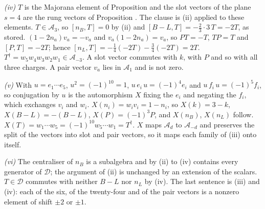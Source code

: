 \emph{(iv)} $T$ is the Majorana element of Proposition  and the slot vectors of the plane $s = 4$ are the rung vectors of Proposition . The clause is (ii) applied to these elements. $T \in \mathcal{A}_{3}$, so $[n_{B}, T] = 0$ by (ii) and $[B - L, T] = -\tfrac23 \cdot 3\,T = -2T$, as stored. $(1 - 2n_{a})v_{a} = -v_{a}$ and $v_{a}(1 - 2n_{a}) = v_{a}$, so $PT = -T$, $TP = T$ and $[P, T] = -2T$; hence $[n_{L}, T] = -\tfrac14(-2T) - \tfrac34(-2T) = 2T$. $T^{\dagger} = w_{5}w_{4}w_{3}w_{2}w_{1} \in \mathcal{A}_{-3}$. A slot vector commutes with $k$, with $P$ and so with all three charges. A pair vector $v_{a}$ lies in $\mathcal{A}_{1}$ and is not zero.

\emph{(v)} With $u = e_{1}\cdots e_{5}$, $u^{2} = (-1)^{10} = 1$, $u\,e_{i}\,u = (-1)^{4}e_{i}$ and $u\,f_{i}\,u = (-1)^{5}f_{i}$, so conjugation by $u$ is the automorphism $X$ fixing the $e_{i}$ and negating the $f_{i}$, which exchanges $v_{i}$ and $w_{i}$. $X(n_{i}) = w_{i}v_{i} = 1 - n_{i}$, so $X(k) = 3 - k$, $X(B - L) = -(B - L)$, $X(P) = (-1)^{3}P$, and $X(n_{B})$, $X(n_{L})$ follow. $X(T) = w_{1}\cdots w_{5} = (-1)^{10}w_{5}\cdots w_{1} = T^{\dagger}$. $X$ maps $\mathcal{A}_{d}$ to $\mathcal{A}_{-d}$ and preserves the split of the vectors into slot and pair vectors, so it maps each family of (iii) onto itself.

\emph{(vi)} The centraliser of $n_{B}$ is a subalgebra and by (ii) to (iv) contains every generator of $\mathcal{D}$; the argument of (ii) is unchanged by an extension of the scalars. $T \in \mathcal{D}$ commutes with neither $B - L$ nor $n_{L}$ by (iv). The last sentence is (iii) and (iv): each of the six, of the twenty-four and of the pair vectors is a nonzero element of shift $\pm 2$ or $\pm 1$.
